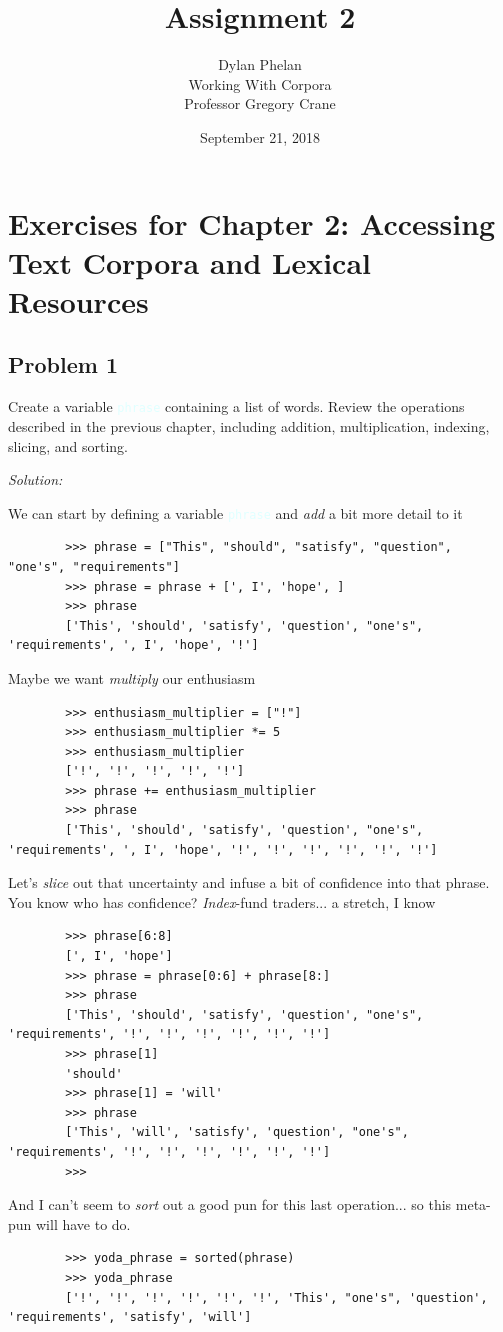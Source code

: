 \documentclass[11pt]{article}
\author{ 
	Dylan Phelan \\ 
	Working With Corpora \\ 
	Professor Gregory Crane 
}
\title{Assignment 2}
\date{September 21, 2018}
\newenvironment{solution}{
	\vspace{10px}\noindent\emph{Solution:}
}{
	\vspace{10px}
}
\newcommand{\codeword}[1]{
	\texttt{\textcolor{lightCyan}{#1}}
}
\begin{document}
\maketitle

\section*{Exercises for Chapter 2: Accessing Text Corpora and Lexical Resources}
\subsection*{Problem 1}

Create a variable \codeword{phrase} containing a list of words. Review the operations described in the previous chapter, including addition, multiplication, indexing, slicing, and sorting.

\begin{solution}
	
	We can start by defining a variable \codeword{phrase} and \emph{add} a bit more detail to it
	\begin{lstlisting}
		>>> phrase = ["This", "should", "satisfy", "question", "one's", "requirements"]
		>>> phrase = phrase + [', I', 'hope', ]
		>>> phrase
        ['This', 'should', 'satisfy', 'question', "one's", 'requirements', ', I', 'hope', '!']
	\end{lstlisting}

    Maybe we want \emph{multiply} our enthusiasm 
	\begin{lstlisting}
		>>> enthusiasm_multiplier = ["!"]
		>>> enthusiasm_multiplier *= 5
		>>> enthusiasm_multiplier
		['!', '!', '!', '!', '!']
		>>> phrase += enthusiasm_multiplier
		>>> phrase
		['This', 'should', 'satisfy', 'question', "one's", 'requirements', ', I', 'hope', '!', '!', '!', '!', '!', '!']
	\end{lstlisting}

	Let's \emph{slice} out that uncertainty and infuse a bit of confidence into that phrase. You know who has confidence? \emph{Index}-fund traders... {\tiny a stretch, I know}
	\begin{lstlisting}
		>>> phrase[6:8]
		[', I', 'hope']
		>>> phrase = phrase[0:6] + phrase[8:]
		>>> phrase
		['This', 'should', 'satisfy', 'question', "one's", 'requirements', '!', '!', '!', '!', '!', '!']
		>>> phrase[1]
		'should'
		>>> phrase[1] = 'will'
		>>> phrase
		['This', 'will', 'satisfy', 'question', "one's", 'requirements', '!', '!', '!', '!', '!', '!']
		>>>
	\end{lstlisting}
	
	And I can't seem to \emph{sort} out a good pun for this last operation... so this meta-pun will have to do.
	\begin{lstlisting}
		>>> yoda_phrase = sorted(phrase)
		>>> yoda_phrase
		['!', '!', '!', '!', '!', '!', 'This', "one's", 'question', 'requirements', 'satisfy', 'will']
	\end{lstlisting}
	
\end{solution} 
\end{document}
